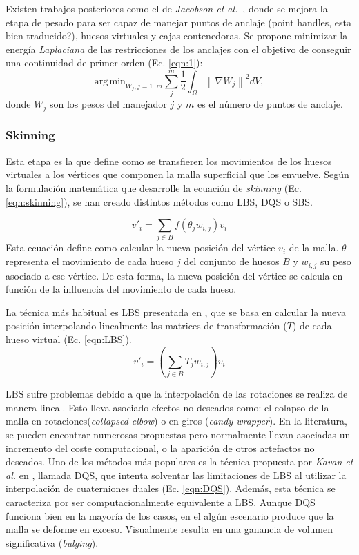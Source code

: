 Existen trabajos posteriores como el de \emph{Jacobson et al.}~\cite{Jacobson:2011}, donde se mejora la etapa de pesado para ser capaz de manejar puntos de anclaje (point handles, esta bien traducido?), huesos virtuales y cajas contenedoras. Se propone minimizar la energía \emph{Laplaciana} de las restricciones de los anclajes con el objetivo de conseguir una continuidad  de primer orden (Ec. \ref{eqn:1}):
\begin{equation}
\label{eqn:1}
\mathrm{arg\,min}_{W_j, j=1..m}\sum_{j}^m\frac{1}{2}\int_\Omega \left \|  \nabla W_j\right \|^2 dV,
\end{equation}
donde $W_j$ son los pesos del manejador $j$ y $m$ es el número de puntos de anclaje. 

\subsubsection{Skinning}
\label{art:skinning}

Esta etapa es la que define como se transfieren los movimientos de los huesos virtuales a los vértices que componen la malla superficial que los envuelve. Según la formulación matemática que desarrolle la ecuación de \emph{skinning} (Ec. \ref{eqn:skinning}), se han creado distintos métodos como \ac{LBS}, \ac{DQS} o \ac{SBS}.

\begin{equation}
\label{eqn:skinning}
v'_{i} = \sum_{j \in B} f(\theta_{j}w_{i,j}) v_{i}
\end{equation}
Esta ecuación define como calcular la nueva posición del vértice $v_{i}$ de la malla. $\theta$ representa el movimiento de cada hueso $j$ del conjunto de huesos $B$ y $w_{i,j}$ su peso asociado a ese vértice. De esta forma, la nueva posición del vértice se calcula en función de la influencia del movimiento de cada hueso.

La técnica más habitual es \ac{LBS} presentada en \cite{thalmann88}, que se basa en calcular la nueva posición interpolando linealmente las matrices de transformación ($T$) de cada hueso virtual (Ec. \ref{eqn:LBS}).
\begin{equation}
\label{eqn:LBS}
v'_{i} = (\sum_{j \in B} T_{j}w_{i,j}) v_{i}
\end{equation}

\ac{LBS} sufre problemas debido a que la interpolación de las rotaciones se realiza de manera lineal. Esto lleva asociado efectos no deseados como: el colapso de la malla  en rotaciones(\emph{collapsed elbow}) o en giros (\emph{candy wrapper}). En la literatura, se pueden encontrar numerosas propuestas \cite{rumman2016state} pero normalmente llevan asociadas un incremento del coste computacional, o la aparición de otros artefactos no deseados. Uno de los métodos más populares es la técnica propuesta por \emph{Kavan et al.} en \cite{Kavan2008}, llamada \ac{DQS}, que intenta solventar las limitaciones de \ac{LBS} al utilizar la interpolación de cuaterniones duales (Ec. \ref{eqn:DQS}). Además, esta técnica se caracteriza por ser computacionalmente equivalente a \ac{LBS}. Aunque \ac{DQS} funciona bien en la mayoría de los casos, en el algún escenario produce que la malla se deforme en exceso. Visualmente resulta en una ganancia de volumen significativa (\emph{bulging}). 

